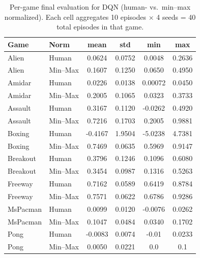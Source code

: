 \begin{table}[htbp]
	\centering
	\begin{tabular}{llcccc}
		\toprule
		\textbf{Game} & \textbf{Norm} & \textbf{mean} & \textbf{std} & \textbf{min} & \textbf{max}\\
		\midrule
		Alien    & Human   & 0.0624 & 0.0752 & 0.0048 & 0.2636 \\
		Alien    & Min--Max & 0.1607 & 0.1250 & 0.0650 & 0.4950 \\
		\cmidrule{1-6}
		Amidar   & Human   & 0.0226 & 0.0138 & 0.00072 & 0.0450 \\
		Amidar   & Min--Max & 0.2005 & 0.1065 & 0.0323 & 0.3733 \\
		\cmidrule{1-6}
		Assault  & Human   & 0.3167 & 0.1120 & -0.0262 & 0.4920 \\
		Assault  & Min--Max & 0.7216 & 0.1703 & 0.2005 & 0.9881 \\
		\cmidrule{1-6}
		Boxing   & Human   & -0.4167 & 1.9504 & -5.0238 & 4.7381 \\
		Boxing   & Min--Max & 0.7469 & 0.0635 & 0.5969 & 0.9147 \\
		\cmidrule{1-6}
		Breakout & Human   & 0.3796 & 0.1246 & 0.1096 & 0.6080 \\
		Breakout & Min--Max & 0.3454 & 0.0987 & 0.1316 & 0.5263 \\
		\cmidrule{1-6}
		Freeway  & Human   & 0.7162 & 0.0589 & 0.6419 & 0.8784 \\
		Freeway  & Min--Max & 0.7571 & 0.0622 & 0.6786 & 0.9286 \\
		\cmidrule{1-6}
		MsPacman & Human   & 0.0099 & 0.0120 & -0.0076 & 0.0262 \\
		MsPacman & Min--Max & 0.1047 & 0.0484 & 0.0340 & 0.1702 \\
		\cmidrule{1-6}
		Pong     & Human   & -0.0083 & 0.0074 & -0.01 & 0.0233 \\
		Pong     & Min--Max & 0.0050 & 0.0221 & 0.0 & 0.1 \\
		\bottomrule
	\end{tabular}
	\caption{Per-game final evaluation for DQN (human- vs.\ min--max normalized). 
		Each cell aggregates 10 episodes $\times$ 4 seeds = 40 total episodes in that game.}
	\label{tab:dqn_eval_gamewise}
\end{table}

